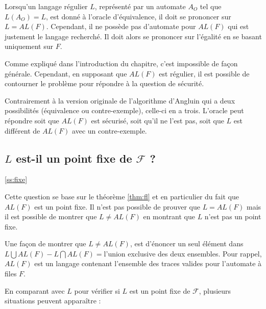 Lorsqu'un langage régulier $L$, représenté par un automate $A_O$ tel que $L(A_O)=L$, est donné à l'oracle d'équivalence, il doit se prononcer sur $L=AL(F)$. Cependant, il ne possède pas d'automate pour $AL(F)$ qui est justement le langage recherché. Il doit alors se prononcer sur l'égalité en se basant uniquement sur $F$.

Comme expliqué dans l'introduction du chapitre, c'est impossible de façon générale. Cependant, en supposant que $AL(F)$ est régulier, il est possible de contourner le problème pour répondre à la question de sécurité.

Contrairement à la version originale de l'algorithme d'Angluin qui a deux possibilités (équivalence ou contre-exemple), celle-ci en a trois. L'oracle peut répondre soit que $AL(F)$ est sécurisé, soit qu'il ne l'est pas, soit que $L$ est différent de $AL(F)$ avec un contre-exemple.


\subsection{$L$ est-il un point fixe de $\mathcal{F}$ ?}\ref{ss:fixe}

Cette question se base sur le théorème \ref{thm:fl} et en particulier du fait que $AL(F)$ est un point fixe. Il n'est pas possible de prouver que $L=AL(F)$ mais il est possible de montrer que $L\neq AL(F)$ en montrant que $L$ n'est pas un point fixe.

Une façon de montrer que $L\neq AL(F)$, est d'énoncer un seul élément dans $L\bigcup AL(F)-L\bigcap AL(F)=$\alfx l'union exclusive des deux ensembles. Pour rappel, $AL(F)$ est un langage contenant l'ensemble des traces valides pour l'automate à files $F$.

En comparant \fl avec $L$ pour vérifier si $L$ est un point fixe de $\mathcal{F}$, plusieurs situations peuvent apparaître :


